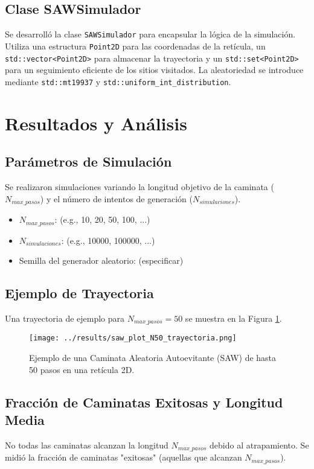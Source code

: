 \documentclass[11pt,a4paper]{article}
\begin{document}
\subsection{Clase SAWSimulador}
Se desarrolló la clase \texttt{SAWSimulador} para encapsular la lógica de la simulación. Utiliza una estructura \texttt{Point2D} para las coordenadas de la retícula, un \texttt{std::vector<Point2D>} para almacenar la trayectoria y un \texttt{std::set<Point2D>} para un seguimiento eficiente de los sitios visitados. La aleatoriedad se introduce mediante \texttt{std::mt19937} y \texttt{std::uniform\_int\_distribution}.

\section{Resultados y Análisis}
\subsection{Parámetros de Simulación}
Se realizaron simulaciones variando la longitud objetivo de la caminata ($N_{max\_pasos}$) y el número de intentos de generación ($N_{simulaciones}$).
\begin{itemize}
    \item $N_{max\_pasos}$: (e.g., 10, 20, 50, 100, ...)
    \item $N_{simulaciones}$: (e.g., 10000, 100000, ...)
    \item Semilla del generador aleatorio: (especificar)
\end{itemize}

\subsection{Ejemplo de Trayectoria}
Una trayectoria de ejemplo para $N_{max\_pasos} = 50$ se muestra en la Figura \ref{fig:saw_trayectoria}.
\begin{figure}[h!]
    \centering
    \texttt{[image: ../results/saw\_plot\_N50\_trayectoria.png]} %
    \caption{Ejemplo de una Caminata Aleatoria Autoevitante (SAW) de hasta 50 pasos en una retícula 2D.}
    \label{fig:saw_trayectoria}
\end{figure}

\subsection{Fracción de Caminatas Exitosas y Longitud Media}
No todas las caminatas alcanzan la longitud $N_{max\_pasos}$ debido al atrapamiento. Se midió la fracción de caminatas "exitosas" (aquellas que alcanzan $N_{max\_pasos}$).
\end{document}
